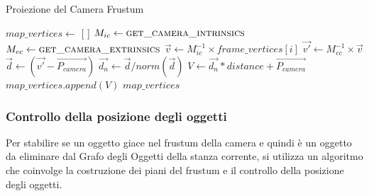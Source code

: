 \begin{algorithm}
	\caption{Proiezione del Camera Frustum}
	\begin{algorithmic}[1]
		\State $map\_vertices \gets$ [ ]
		\State $M_{ic} \gets \Call{get\_camera\_intrinsics}{}$
		\State $M_{ec} \gets \Call{get\_camera\_extrinsics}{}$
		\State $\vec{v} \gets M_{ic}^{-1} \times frame\_vertices[i]$
		\State $\vec{v'} \gets M_{ec}^{-1} \times \vec{v}$
		\State $\vec{d} \gets (\vec{v'} - \overrightarrow{P_{camera}})$
		\State $\vec{d_n} \gets \vec{d} / norm(\vec{d})$
		\State $V \gets \vec{d_n} * distance + \overrightarrow{P_{camera}}$
		\State $map\_vertices.append(V)$
		\EndFor
		\State \Return $map\_vertices$
		\EndProcedure
	\end{algorithmic}
\end{algorithm}
\subsubsection{Controllo della posizione degli oggetti}
Per stabilire se un oggetto giace nel frustum della camera e quindi è un oggetto da eliminare dal Grafo degli Oggetti della stanza corrente, si utilizza un algoritmo che coinvolge la costruzione dei piani del frustum e il controllo della posizione degli oggetti.
